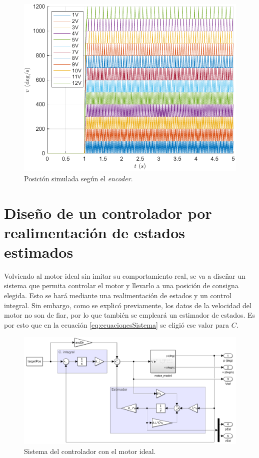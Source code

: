 \documentclass{article}
\begin{document}
\begin{figure}[H]
    \centering
    \includegraphics[width=0.75\linewidth]{img/velocidadIdealEncoder.pdf}
    \caption{Posición simulada según el \textit{encoder}.}
    \label{fig:velocidadIdealEncoder}
\end{figure}


\section{Diseño de un controlador por realimentación de estados estimados}

Volviendo al motor ideal sin imitar su comportamiento real, se va a diseñar un sistema que permita controlar el motor y llevarlo a una posición de consigna elegida. Esto se hará mediante una realimentación de estados y un control integral. Sin embargo, como se explicó previamente, los datos de la velocidad del motor no son de fiar, por lo que también se empleará un estimador de estados. Es por esto que en la ecuación \ref{eq:ecuacionesSistema} se eligió ese valor para $C$.

\begin{figure}[H]
    \centering
    \includegraphics[width=0.75\linewidth]{img/controlador.png}
    \caption{Sistema del controlador con el motor ideal.}
    \label{fig:controlador}
\end{figure}
\end{document}
